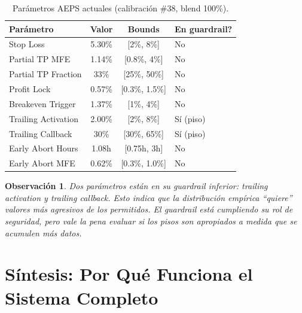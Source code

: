 \documentclass[11pt,a4paper]{article}
\newtheorem{remark}{Observaci\'on}[section]
\begin{document}
\begin{table}[H]
\centering
\caption{Par\'ametros AEPS actuales (calibraci\'on \#38, blend 100\%).}
\label{tab:current_aeps}
\begin{tabular}{lccl}
\toprule
\textbf{Par\'ametro} & \textbf{Valor} & \textbf{Bounds} & \textbf{En guardrail?} \\
\midrule
Stop Loss & 5.30\% & [2\%, 8\%] & No \\
Partial TP MFE & 1.14\% & [0.8\%, 4\%] & No \\
Partial TP Fraction & 33\% & [25\%, 50\%] & No \\
Profit Lock & 0.57\% & [0.3\%, 1.5\%] & No \\
Breakeven Trigger & 1.37\% & [1\%, 4\%] & No \\
Trailing Activation & 2.00\% & [2\%, 8\%] & \textcolor{corange}{S\'i (piso)} \\
Trailing Callback & 30\% & [30\%, 65\%] & \textcolor{corange}{S\'i (piso)} \\
Early Abort Hours & 1.08h & [0.75h, 3h] & No \\
Early Abort MFE & 0.62\% & [0.3\%, 1.0\%] & No \\
\bottomrule
\end{tabular}
\end{table}

\begin{remark}
Dos par\'ametros est\'an en su guardrail inferior: trailing activation
y trailing callback. Esto indica que la distribuci\'on emp\'irica
``quiere'' valores m\'as agresivos de los permitidos. El guardrail
est\'a cumpliendo su rol de seguridad, pero vale la pena evaluar
si los pisos son apropiados a medida que se acumulen m\'as datos.
\end{remark}


\section{S\'intesis: Por Qu\'e Funciona el Sistema Completo}
\label{sec:synthesis}
\end{document}
